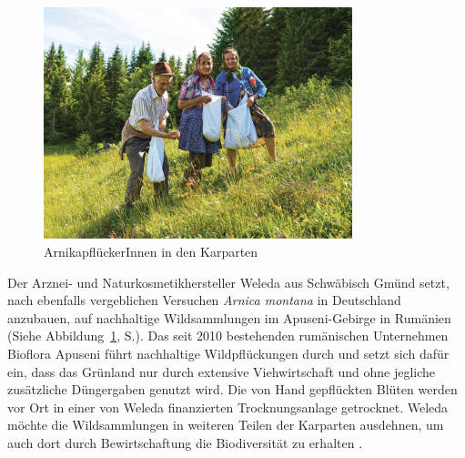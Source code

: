 \begin{figure}[htb]
 \centering
 \includegraphics[width=0.8\textwidth,angle=0]{abb/Arnika/Arnikapfluecker-1024x768}
 \caption{ArnikapflückerInnen in den Karparten \citep{Mestrovic2019}}
\label{fig:pfluecker}
\end{figure}

Der Arznei- und Naturkosmetikhersteller Weleda aus Schwäbisch Gmünd setzt, nach ebenfalls vergeblichen Versuchen \textit{Arnica montana} in Deutschland anzubauen, auf nachhaltige Wildsammlungen im Apuseni-Gebirge in Rumänien (Siehe Abbildung~\ref{fig:pfluecker}, S.\pageref{fig:pfluecker}). Das seit 2010 bestehenden rumänischen Unternehmen Bioflora Apuseni führt nachhaltige Wildpflückungen durch und setzt sich dafür ein, dass das Grünland nur durch extensive Viehwirtschaft und ohne jegliche zusätzliche Düngergaben genutzt wird. Die von Hand gepflückten Blüten werden vor Ort in einer von Weleda finanzierten Trocknungsanlage getrocknet. Weleda möchte die Wildsammlungen in weiteren Teilen der Karparten ausdehnen, um auch dort durch Bewirtschaftung die Biodiversität zu erhalten \citep[vgl.][]{Weleda2019}. 
